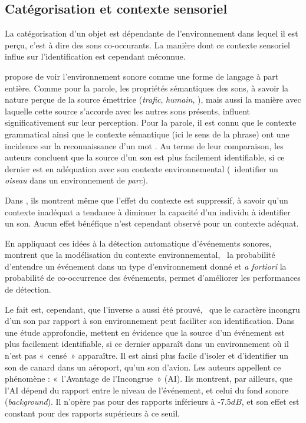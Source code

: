 \subsection{Catégorisation et contexte sensoriel}
\label{sec:ch3_categoEtContexte}

La catégorisation d'un objet est dépendante de l'environnement dans lequel il est perçu, c'est à dire des sons co-occurants. La manière dont ce contexte sensoriel influe sur l'identification est cependant méconnue.

\citep{ballas1987interpreting} propose de voir l'environnement sonore comme une forme de langage à part entière. Comme pour la parole, les propriétés sémantiques des sons, à savoir la nature perçue de la source émettrice (\emph{trafic}, \emph{humain}, \etc), mais aussi la manière avec laquelle cette source s'accorde avec les autres sons présents, influent significativement sur leur perception. Pour la parole, il est connu que le contexte grammatical ainsi que le contexte sémantique (ici le sens de la phrase) ont une incidence sur la reconnaissance d'un mot \citep{bilger1984standardization}. Au terme de leur comparaison, les auteurs concluent que la source d'un son est plus facilement identifiable, si ce dernier est en adéquation avec son contexte environnemental (\eg~identifier un \emph{oiseau} dans un environnement de \emph{parc}).

Dans \citep{ballas1991effects}, ils montrent même que l'effet du contexte est suppressif, à savoir qu'un contexte inadéquat a tendance à diminuer la capacité d'un individu à identifier un son. Aucun effet bénéfique n'est cependant observé pour un contexte adéquat.

En appliquant ces idées à la détection automatique d'événements sonores, \citep{niessen2008disambiguating} montrent que la modélisation du contexte environnemental, \ie~la probabilité d'entendre un événement dans un type d'environnement donné et \emph{a fortiori} la probabilité de co-occurrence des événements, permet d'améliorer les performances de détection. 

Le fait est, cependant, que l'inverse a aussi été prouvé, \ie~que le caractère incongru d'un son par rapport à son environnement peut faciliter son identification. Dans une étude approfondie, \citep{gygi2011incongruency} mettent en évidence que la source d'un événement est plus facilement identifiable, si ce dernier apparaît dans un environnement où il n'est pas «~censé~» apparaître. Il est ainsi plus facile d'isoler et d'identifier un son de canard dans un aéroport, qu'un son d'avion. Les auteurs appellent ce phénomène : «~l'Avantage de l'Incongrue~» (AI). Ils montrent, par ailleurs, que l'AI dépend du rapport entre le niveau de l'événement, et celui du fond sonore (\emph{background}). Il n'opère pas pour des rapports inférieurs à -7.5$dB$, et son effet est constant pour des rapports supérieurs à ce seuil.

